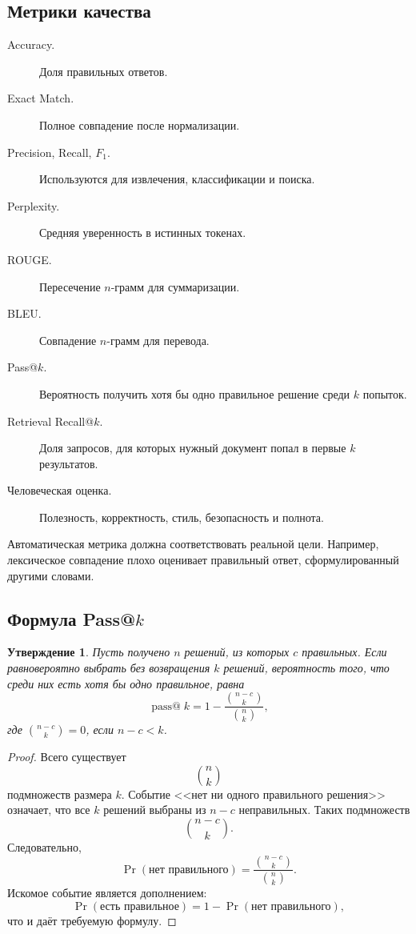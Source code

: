 \documentclass[12pt,a4paper]{article}
\newcommand{\1}{\mathbf{1}}
\newtheorem{proposition}[theorem]{Утверждение}
\theoremstyle{definition}
\theoremstyle{remark}
\begin{document}
\subsection{Метрики качества}

\begin{description}
    \item[Accuracy.] Доля правильных ответов.
    \item[Exact Match.] Полное совпадение после нормализации.
    \item[Precision, Recall, $F_1$.] Используются для извлечения,
    классификации и поиска.
    \item[Perplexity.] Средняя уверенность в истинных токенах.
    \item[ROUGE.] Пересечение $n$-грамм для суммаризации.
    \item[BLEU.] Совпадение $n$-грамм для перевода.
    \item[Pass@$k$.] Вероятность получить хотя бы одно правильное решение
    среди $k$ попыток.
    \item[Retrieval Recall@$k$.] Доля запросов, для которых нужный
    документ попал в первые $k$ результатов.
    \item[Человеческая оценка.] Полезность, корректность, стиль,
    безопасность и полнота.
\end{description}

Автоматическая метрика должна соответствовать реальной цели. Например,
лексическое совпадение плохо оценивает правильный ответ, сформулированный
другими словами.

\subsection{Формула Pass@$k$}

\begin{proposition}
Пусть получено $n$ решений, из которых $c$ правильных. Если равновероятно
выбрать без возвращения $k$ решений, вероятность того, что среди них
есть хотя бы одно правильное, равна
\[
\operatorname{pass@}k
=
1-
\frac{\binom{n-c}{k}}
{\binom{n}{k}},
\]
где $\binom{n-c}{k}=0$, если $n-c<k$.
\end{proposition}

\begin{proof}
Всего существует
\[
\binom{n}{k}
\]
подмножеств размера $k$. Событие <<нет ни одного правильного решения>>
означает, что все $k$ решений выбраны из $n-c$ неправильных. Таких
подмножеств
\[
\binom{n-c}{k}.
\]
Следовательно,
\[
\Pr(\text{нет правильного})
=
\frac{\binom{n-c}{k}}
{\binom{n}{k}}.
\]
Искомое событие является дополнением:
\[
\Pr(\text{есть правильное})
=
1-
\Pr(\text{нет правильного}),
\]
что и даёт требуемую формулу.
\end{proof}
\end{document}
